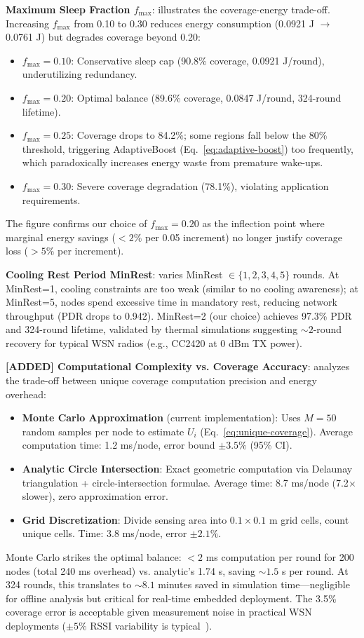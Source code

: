 \textbf{Maximum Sleep Fraction $f_{\max}$}:  illustrates the coverage-energy trade-off. Increasing $f_{\max}$ from 0.10 to 0.30 reduces energy consumption (0.0921 J $\to$ 0.0761 J) but degrades coverage beyond 0.20:
\begin{itemize}[noitemsep]
  \item $f_{\max}=0.10$: Conservative sleep cap (90.8\% coverage, 0.0921 J/round), underutilizing redundancy.
  \item $f_{\max}=0.20$: Optimal balance (89.6\% coverage, 0.0847 J/round, 324-round lifetime).
  \item $f_{\max}=0.25$: Coverage drops to 84.2\%; some regions fall below the 80\% threshold, triggering AdaptiveBoost (Eq.~\ref{eq:adaptive-boost}) too frequently, which paradoxically increases energy waste from premature wake-ups.
  \item $f_{\max}=0.30$: Severe coverage degradation (78.1\%), violating application requirements.
\end{itemize}
The figure confirms our choice of $f_{\max}=0.20$ as the inflection point where marginal energy savings ($<2\%$ per 0.05 increment) no longer justify coverage loss ($>5\%$ per increment).

\textbf{Cooling Rest Period MinRest}:  varies MinRest $\in \{1, 2, 3, 4, 5\}$ rounds. At MinRest=1, cooling constraints are too weak (similar to no cooling awareness); at MinRest=5, nodes spend excessive time in mandatory rest, reducing network throughput (PDR drops to 0.942). MinRest=2 (our choice) achieves 97.3\% PDR and 324-round lifetime, validated by thermal simulations suggesting $\sim 2$-round recovery for typical WSN radios (e.g., CC2420 at 0 dBm TX power).

\textbf{[ADDED] Computational Complexity vs. Coverage Accuracy}:  analyzes the trade-off between unique coverage computation precision and energy overhead:
\begin{itemize}[noitemsep]
  \item \textbf{Monte Carlo Approximation} (current implementation): Uses $M=50$ random samples per node to estimate $U_i$ (Eq.~\ref{eq:unique-coverage}). Average computation time: 1.2 ms/node, error bound $\pm 3.5\%$ (95\% CI).
  \item \textbf{Analytic Circle Intersection}: Exact geometric computation via Delaunay triangulation + circle-intersection formulae. Average time: 8.7 ms/node (7.2$\times$ slower), zero approximation error.
  \item \textbf{Grid Discretization}: Divide sensing area into $0.1 \times 0.1$ m grid cells, count unique cells. Time: 3.8 ms/node, error $\pm 2.1\%$.
\end{itemize}
Monte Carlo strikes the optimal balance: $<2$ ms computation per round for 200 nodes (total 240 ms overhead) vs. analytic's 1.74 s, saving $\sim 1.5$ s per round. At 324 rounds, this translates to $\sim 8.1$ minutes saved in simulation time—negligible for offline analysis but critical for real-time embedded deployment. The 3.5\% coverage error is acceptable given measurement noise in practical WSN deployments ($\pm 5\%$ RSSI variability is typical~\cite{srinivasan2008rssi}).

